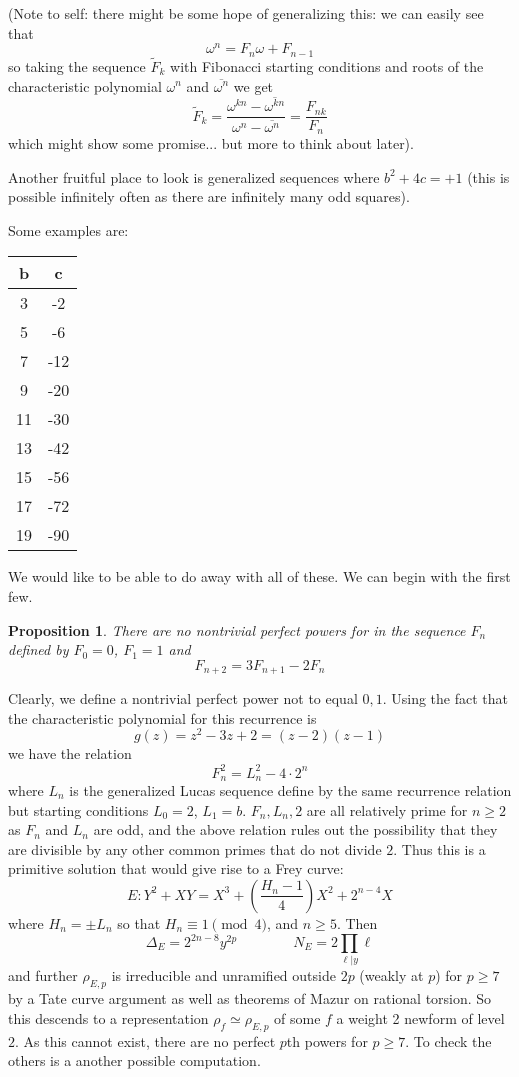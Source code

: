 \documentclass[12pt]{article}
\newtheorem{prop}[thm]{Proposition}
\newenvironment{proof}[1][Proof.]{\begin{trivlist}
\item[\hskip \labelsep {\bfseries #1}]}{\end{trivlist}}
\renewcommand{\bar}{\overline}
\begin{document}
(Note to self: there might be some hope of generalizing this: we can easily see that
\[ \omega^n = F_n\omega +F_{n-1} \]
so taking the sequence $\tilde{F}_k$ with Fibonacci starting conditions and roots of the characteristic polynomial $\omega^n$ and $\bar{\omega^n}$ we get 
\[ \tilde{F}_k = \frac{\omega^{kn} - \bar{\omega^{kn}}}{\omega^n-\bar{\omega^n}} = \frac{F_{nk}}{F_n} \]
which might show some promise... but more to think about later).


Another fruitful place to look is generalized sequences where $b^2+4c = +1$ (this is possible infinitely often as there are infinitely many odd squares).

Some examples are:

\begin{center}
\begin{tabular}{ c | c}
b & c \\ \hline \hline
3 & -2 \\
5 & -6 \\
7 & -12 \\
9 & -20 \\
11 & -30 \\
13 & -42 \\
15 & -56 \\
17 & -72 \\
19 & -90 
\end{tabular}
\end{center}

We would like to be able to do away with all of these.  We can begin with the first few.

\begin{prop}
There are no nontrivial perfect powers for in the sequence $F_n$ defined by $F_0=0$, $F_1=1$ and 
\[ F_{n+2} = 3F_{n+1}-2F_n \]
\end{prop}
\begin{proof}
Clearly, we define a nontrivial perfect power not to equal $0,1$.  Using the fact that the characteristic polynomial for this recurrence is
\[ g(z) = z^2-3z+2 = (z-2)(z-1) \]
we have the relation
\[ F_n^2 = L_n^2 - 4 \cdot 2^n \]
where $L_n$ is the generalized Lucas sequence define by the same recurrence relation but starting conditions $L_0 = 2$, $L_1 = b$.  $F_n, L_n, 2$ are all relatively prime for $n \geq 2$ as $F_n$ and $L_n$ are odd, and the above relation rules out the possibility that they are divisible by any other common primes that do not divide $2$.  Thus this is a primitive solution that would	 give rise to a Frey curve:
\[ E: Y^2 + XY = X^3 + \left(\frac{H_n-1}{4} \right)X^2 + 2^{n-4}X \]
where $H_n = \pm L_n$ so that $H_n \equiv 1 \pmod{4}$, and $n \geq 5$.  Then
\[ \Delta_E = 2^{2n-8}y^{2p} \qquad \qquad N_E = 2 \prod_{\ell | y} \ell \]
and further $\rho_{E,p}$ is irreducible and unramified outside $2p$ (weakly at $p$) for $p \geq 7$ by a Tate curve argument as well as theorems of Mazur on rational torsion.  So this descends to a representation $\rho_f \simeq \rho_{E,p}$ of some $f$ a weight 2 newform of level $2$.  As this cannot exist, there are no perfect $p$th powers for $p \geq 7$.  To check the others is a another possible computation.
\end{proof}
\end{document}
